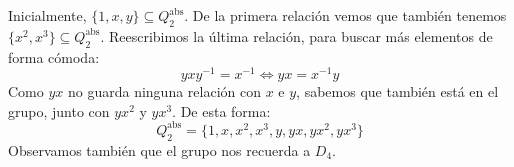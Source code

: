 \begin{ejemplo}
\begin{enumerate}
            Inicialmente, $\{1,x,y\}\subseteq Q^{\text{abs}}_2$. De la primera relación vemos que también tenemos $\{x^2,x^3\}\subseteq Q^{\text{abs}}_2$. Reescribimos la última relación, para buscar más elementos de forma cómoda:
            \begin{equation*}
                yxy^{-1} = x^{-1} \Longleftrightarrow yx = x^{-1}y
            \end{equation*}
            Como $yx$ no guarda ninguna relación con $x$ e $y$, sabemos que también está en el grupo, junto con $yx^2$ y $yx^3$. De esta forma:
            \begin{equation*}
                Q^{\text{abs}}_2 = \{1,x,x^2,x^3,y,yx,yx^2,yx^3\}
            \end{equation*}
            Observamos también que el grupo nos recuerda a $D_4$.
    \end{enumerate}
\end{ejemplo}

